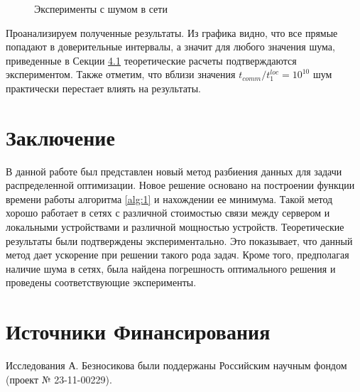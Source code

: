 \documentclass{article}
\theoremstyle{definition}
\theoremstyle{plain}
\begin{document}
\begin{figure}[!ht]
    \caption{Эксперименты с шумом в сети}
    \label{ris:image2}
\end{figure}

Проанализируем полученные результаты. Из графика видно, что все прямые попадают в доверительные интервалы, а значит для любого значения шума, приведенные в Секции \hyperref[s:4.1]{4.1} теоретические расчеты подтверждаются экспериментом. Также отметим, что вблизи значения $t_{comm}/t_1^{loc} = 10^{10}$ шум практически перестает влиять на результаты.

\section{Заключение}

В данной работе был представлен новый метод разбиения данных для задачи распределенной оптимизации. Новое решение основано на построении функции времени работы алгоритма \ref{alg:1} и нахождении ее минимума. Такой метод хорошо работает в сетях с различной стоимостью связи между сервером и локальными устройствами и различной мощностью устройств. Теоретические результаты были подтверждены экспериментально. Это показывает, что данный метод дает ускорение при решении такого рода задач. Кроме того, предполагая наличие шума в сетях, была найдена погрешность оптимального решения и проведены соответствующие эксперименты.

\section*{Источники Финансирования}
Исследования А. Безносикова были поддержаны Российским научным фондом (проект № 23-11-00229).

\printbibliography[heading=bibintoc,title={Источники}]
\end{document}
